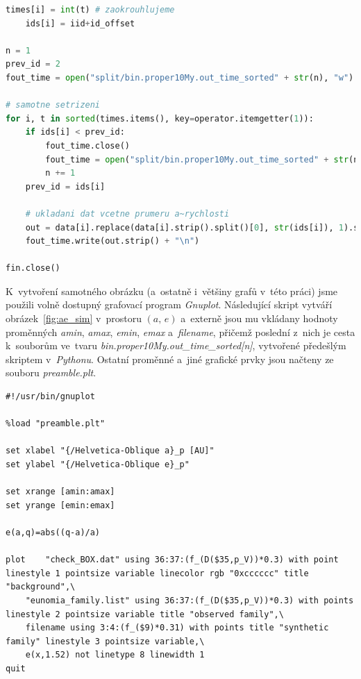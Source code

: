 \documentclass[A4paper, 12pt, oneside, openany]{book}
\begin{document}
\begin{appendices}
\begin{lstlisting}[language=Python]
    times[i] = int(t) # zaokrouhlujeme
    ids[i] = iid+id_offset

n = 1
prev_id = 2
fout_time = open("split/bin.proper10My.out_time_sorted" + str(n), "w")

# samotne setrizeni
for i, t in sorted(times.items(), key=operator.itemgetter(1)):
    if ids[i] < prev_id:
        fout_time.close()
        fout_time = open("split/bin.proper10My.out_time_sorted" + str(n), "w")
        n += 1
    prev_id = ids[i]

    # ukladani dat vcetne prumeru a~rychlosti
    out = data[i].replace(data[i].strip().split()[0], str(ids[i]), 1).strip() + "   " + d[ids[i]].strip() + " " + v[ids[i]].strip()
    fout_time.write(out.strip() + "\n")

fin.close()
	\end{lstlisting}
	
	K~vytvoření samotného obrázku (a~ostatně i~většiny grafů v~této práci) jsme použili volně dostupný grafovací program \textit{Gnuplot}. Následující skript vytváří obrázek~\ref{fig:ae_sim} v~prostoru $(a,\,e)$ a~externě jsou mu vkládany hodnoty proměnných \textit{amin}, \textit{amax}, \textit{emin}, \textit{emax} a~\textit{filename}, přičemž poslední z~nich je cesta k~souborům ve~tvaru \textit{bin.proper10My.out\_time\_sorted[n]}, vytvořené předešlým skriptem v~\textit{Pythonu}. Ostatní proměnné a~jiné grafické prvky jsou načteny ze souboru \textit{preamble.plt}.

\begin{lstlisting}[language=Gnuplot]
#!/usr/bin/gnuplot

%load "preamble.plt"

set xlabel "{/Helvetica-Oblique a}_p [AU]"
set ylabel "{/Helvetica-Oblique e}_p"

set xrange [amin:amax]
set yrange [emin:emax]

e(a,q)=abs((q-a)/a)

plot 	"check_BOX.dat" using 36:37:(f_(D($35,p_V))*0.3) with point linestyle 1 pointsize variable linecolor rgb "0xcccccc" title "background",\
 	"eunomia_family.list" using 36:37:(f_(D($35,p_V))*0.3) with points linestyle 2 pointsize variable title "observed family",\
	filename using 3:4:(f_($9)*0.31) with points title "synthetic family" linestyle 3 pointsize variable,\
	e(x,1.52) not linetype 8 linewidth 1
quit
\end{lstlisting}
\end{appendices}
\end{document}
